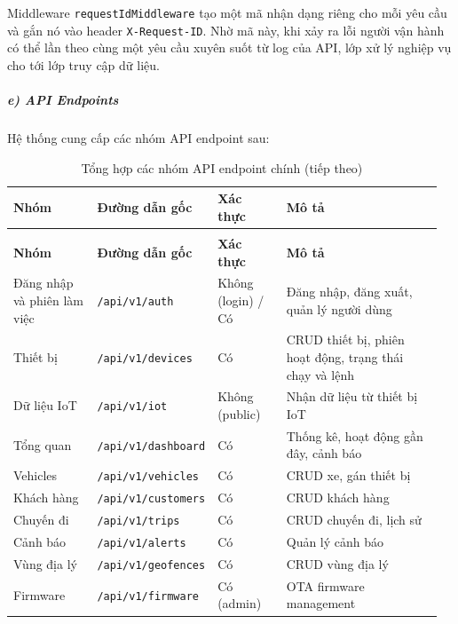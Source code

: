 \documentclass[a4paper]{extarticle}
\newcommand{\thesissettableid}[2]{%
  \renewcommand{\thetable}{#1}%
  \renewcommand{\theHtable}{#2}%
}
\begin{document}
Middleware \texttt{requestIdMiddleware} tạo một mã nhận dạng riêng cho
mỗi yêu cầu và gắn nó vào header \texttt{X-Request-ID}. Nhờ mã này, khi
xảy ra lỗi người vận hành có thể lần theo cùng một yêu cầu xuyên suốt từ
log của API, lớp xử lý nghiệp vụ cho tới lớp truy cập dữ liệu.

\subparagraph{e) API Endpoints}\label{e-api-endpoints}

Hệ thống cung cấp các nhóm API endpoint sau:


{\thesissettableid{4.8}{tab-ch4-tong-hop-cac-nhom-api-endpoint-chinh}
\def\LTcaptype{table}
\begin{longtable}{|L{0.213\linewidth}|L{0.141\linewidth}|L{0.172\linewidth}|L{0.429\linewidth}|}
\caption{Tổng hợp các nhóm API endpoint chính}\label{tab:ch4-tong-hop-cac-nhom-api-endpoint-chinh}\\
\hline \textbf{Nhóm} & \textbf{Đường dẫn gốc} & \textbf{Xác thực} & \textbf{Mô tả} \\
\hline
\endfirsthead
\caption[]{Tổng hợp các nhóm API endpoint chính (tiếp theo)}\\
\hline \textbf{Nhóm} & \textbf{Đường dẫn gốc} & \textbf{Xác thực} & \textbf{Mô tả} \\
\hline
\endhead
\hline
\endfoot
\endlastfoot
Đăng nhập và phiên làm việc & \nolinkurl{/api/v1/auth} & Không (login) / Có & Đăng nhập,
đăng xuất, quản lý người dùng \\\hline
Thiết bị & \nolinkurl{/api/v1/devices} & Có & CRUD thiết bị, phiên hoạt động,
trạng thái chạy và lệnh \\\hline
Dữ liệu IoT & \nolinkurl{/api/v1/iot} & Không (public) & Nhận dữ liệu từ thiết
bị IoT \\\hline
Tổng quan & \nolinkurl{/api/v1/dashboard} & Có & Thống kê, hoạt động gần
đây, cảnh báo \\\hline
Vehicles & \nolinkurl{/api/v1/vehicles} & Có & CRUD xe, gán thiết bị \\\hline
Khách hàng & \nolinkurl{/api/v1/customers} & Có & CRUD khách hàng \\\hline
Chuyến đi & \nolinkurl{/api/v1/trips} & Có & CRUD chuyến đi, lịch sử \\\hline
Cảnh báo & \nolinkurl{/api/v1/alerts} & Có & Quản lý cảnh báo \\\hline
Vùng địa lý & \nolinkurl{/api/v1/geofences} & Có & CRUD vùng địa lý \\\hline
Firmware & \nolinkurl{/api/v1/firmware} & Có (admin) & OTA firmware
management \\\hline
\end{longtable}
}
\end{document}
